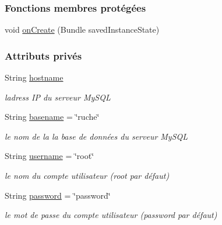 \subsubsection*{Fonctions membres protégées}
\begin{DoxyCompactItemize}
\item 
void \hyperlink{classfr_1_1campus_1_1laurainc_1_1honeybee_1_1_parametres_honey_bee_activity_a43786040ab7dbe39e90bfc684b4c40f7}{on\+Create} (Bundle saved\+Instance\+State)
\end{DoxyCompactItemize}
\subsubsection*{Attributs privés}
\begin{DoxyCompactItemize}
\item 
String \hyperlink{classfr_1_1campus_1_1laurainc_1_1honeybee_1_1_parametres_honey_bee_activity_abe6d58e55747fe47a9d440b925c50f0d}{hostname}
\begin{DoxyCompactList}\small\item\em l\textquotesingle{}adress IP du serveur My\+S\+QL \end{DoxyCompactList}\item 
String \hyperlink{classfr_1_1campus_1_1laurainc_1_1honeybee_1_1_parametres_honey_bee_activity_aaccd793d1d2883ca9471fe783915a9de}{basename} = \char`\"{}ruche\char`\"{}
\begin{DoxyCompactList}\small\item\em le nom de la la base de données du serveur My\+S\+QL \end{DoxyCompactList}\item 
String \hyperlink{classfr_1_1campus_1_1laurainc_1_1honeybee_1_1_parametres_honey_bee_activity_a91b281cedd628be41899059c32a4fe03}{username} = \char`\"{}root\char`\"{}
\begin{DoxyCompactList}\small\item\em le nom du compte utilisateur (root par défaut) \end{DoxyCompactList}\item 
String \hyperlink{classfr_1_1campus_1_1laurainc_1_1honeybee_1_1_parametres_honey_bee_activity_a040c25d676f0391af65c55349575bc66}{password} = \char`\"{}password\char`\"{}
\begin{DoxyCompactList}\small\item\em le mot de passe du compte utilisateur (password par défaut) \end{DoxyCompactList}\end{DoxyCompactItemize}
